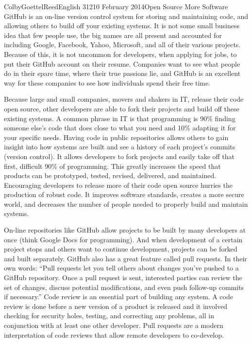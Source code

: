\documentclass[12pt]{article}
\begin{document}
\begin{mla}{Colby}{Goettel}{Reed}{English 312}{10 February 2014}{Open Source More Software}
GitHub is an on-line version control system for storing and maintaining code, and allowing others to build off your existing systems. It is not some small business idea that few people use, the big names are all present and accounted for including Google, Facebook, Yahoo, Microsoft, and all of their various projects. Because of this, it is not uncommon for developers, when applying for jobs, to put their GitHub account on their resume. Companies want to see what people do in their spare time, where their true passions lie, and GitHub is an excellent way for these companies to see how individuals spend their free time.

Because large and small companies, movers and shakers in IT, release their code open source, other developers are able to fork their projects and build off these existing systems. A common phrase in IT is that programming is 90\% finding someone else's code that does close to what you need and 10\% adapting it for your specific needs. Having code in public repositories allows others to gain insight into how systems are built and see a history of each project's commits (version control). It allows developers to fork projects and easily take off that first, difficult 90\% of programming. This greatly increases the speed that products can be prototyped, tested, revised, delivered, and maintained. Encouraging developers to release more of their code open source hurries the production of robust code. It improves software standards, creates a more secure world, and decreases the number of people needed to properly build and maintain systems.

On-line repositories like GitHub allow projects to be built by many developers at once (think Google Docs for programming). And when development of a certain project stops and others want to continue development, projects can be forked and built separately. GitHub also has a great feature called pull requests. In their own words: ``Pull requests let you tell others about changes you've pushed to a GitHub repository. Once a pull request is sent, interested parties can review the set of changes, discuss potential modifications, and even push follow-up commits if necessary.'' Code review is an essential part of building any system. A code review is done before a new version of a product is released and it involved checking for security holes, testing, and correcting any problems, all in conjunction with at least one other developer. Pull requests are a modern interpretation of code reviews that allow remote developers to co-develop.


\end{mla}
\end{document}
